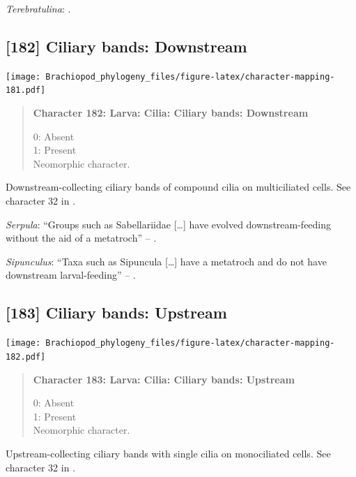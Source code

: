 \documentclass[openany]{book}
\begin{document}
\hypertarget{Terebratulina-coding-181}{}
\emph{Terebratulina}: \citet{Williams1997Introduction}.

\subsection*{{[}182{]} Ciliary bands:
Downstream}\label{ciliary-bands-downstream}

\texttt{[image: Brachiopod\_phylogeny\_files/figure-latex/character-mapping-181.pdf]}

\begin{quote}
\textbf{Character 182: Larva: Cilia: Ciliary bands: Downstream}

0: Absent\\
1: Present\\
Neomorphic character.
\end{quote}

Downstream-collecting ciliary bands of compound cilia on multiciliated
cells. See character 32 in \citet{Glenner2004}.

\hypertarget{Serpula-coding-182}{}
\emph{Serpula}: ``Groups such as Sabellariidae {[}\ldots{}{]} have
evolved downstream-feeding without the aid of a metatroch'' --
\citep{Rouse2000}.

\hypertarget{Sipunculus-coding-182}{}
\emph{Sipunculus}: ``Taxa such as Sipuncula {[}\ldots{}{]} have a
metatroch and do not have downstream larval-feeding'' --
\citet{Rouse2000}.

\subsection*{{[}183{]} Ciliary bands:
Upstream}\label{ciliary-bands-upstream}

\texttt{[image: Brachiopod\_phylogeny\_files/figure-latex/character-mapping-182.pdf]}

\begin{quote}
\textbf{Character 183: Larva: Cilia: Ciliary bands: Upstream}

0: Absent\\
1: Present\\
Neomorphic character.
\end{quote}

Upstream-collecting ciliary bands with single cilia on monociliated
cells. See character 32 in \citet{Glenner2004}.
\end{document}
